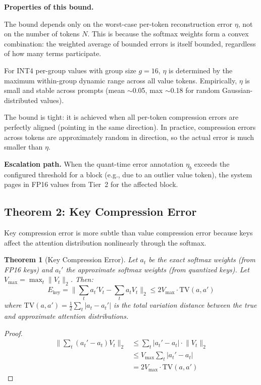 \documentclass[10pt,twocolumn,a4paper]{article}
\newtheorem{theorem}{Theorem}[section]
\theoremstyle{definition}
\theoremstyle{remark}
\newcommand{\norm}[1]{\lVert #1 \rVert}
\begin{document}
\textbf{Properties of this bound.}

The bound depends only on the worst-case per-token reconstruction error $\eta$, not on the number of tokens $N$.  This is because the softmax weights form a convex combination: the weighted average of bounded errors is itself bounded, regardless of how many terms participate.

For INT4 per-group values with group size $g{=}16$, $\eta$ is determined by the maximum within-group dynamic range across all value tokens.  Empirically, $\eta$ is small and stable across prompts (mean $\sim$0.05, max $\sim$0.18 for random Gaussian-distributed values).

The bound is tight: it is achieved when all per-token compression errors are perfectly aligned (pointing in the same direction).  In practice, compression errors across tokens are approximately random in direction, so the actual error is much smaller than $\eta$.

\textbf{Escalation path.}  When the quant-time error annotation $\eta_b$ exceeds the configured threshold for a block (e.g., due to an outlier value token), the system pages in FP16 values from Tier~2 for the affected block.

\subsection{Theorem 2: Key Compression Error}
\label{sec:key_error}

Key compression error is more subtle than value compression error because keys affect the attention distribution nonlinearly through the softmax.

\begin{theorem}[Key Compression Error]
\label{thm:key}
Let $a_t$ be the exact softmax weights (from FP16 keys) and $a_t'$ the approximate softmax weights (from quantized keys).  Let $V_{\max} = \max_t \norm{V_t}_2$.  Then:
\begin{equation}
  E_{\mathrm{key}} = \norm{\sum_t a_t' V_t - \sum_t a_t V_t}_2 \leq 2 V_{\max} \cdot \mathrm{TV}(a, a')
\end{equation}
where $\mathrm{TV}(a, a') = \frac{1}{2}\sum_t |a_t - a_t'|$ is the total variation distance between the true and approximate attention distributions.
\end{theorem}

\begin{proof}
\begin{align*}
  \norm{\sum_t (a_t' - a_t) V_t}_2
    &\leq \sum_t |a_t' - a_t| \cdot \norm{V_t}_2 \\
    &\leq V_{\max} \sum_t |a_t' - a_t| \\
    &= 2 V_{\max} \cdot \mathrm{TV}(a, a')
\end{align*}
\end{proof}
\end{document}
